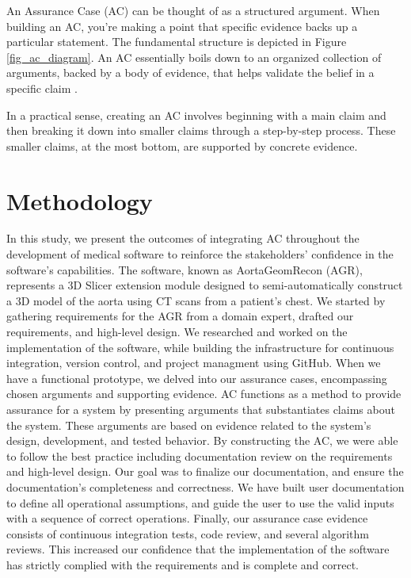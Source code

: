 An Assurance Case (AC) can be thought of as a structured argument. When building an AC, you're making a point that specific evidence backs up a particular statement. The fundamental structure is depicted in Figure \ref{fig_ac_diagram}. An AC essentially boils down to an organized collection of arguments, backed by a body of evidence, that helps validate the belief in a specific claim \cite{doi:10.2514/6.2009-1921}.

In a practical sense, creating an AC involves beginning with a main claim and then breaking it down into smaller claims through a step-by-step process. These smaller claims, at the most bottom, are supported by concrete evidence.


\section{Methodology} \label{methodology}
In this study, we present the outcomes of integrating AC throughout the development of medical software to reinforce the stakeholders' confidence in the software's capabilities. The software, known as AortaGeomRecon (AGR), represents a 3D Slicer \cite{Kikinis2014} extension module designed to semi-automatically construct a 3D model of the aorta using CT scans from a patient's chest. We started by gathering requirements for the AGR from a domain expert, drafted our requirements, and high-level design. We researched and worked on the implementation of the software, while building the infrastructure for continuous integration, version control, and project managment using GitHub. When we have a functional prototype, we delved into our assurance cases, encompassing chosen arguments and supporting evidence. AC functions as a method to provide assurance for a system by presenting arguments that substantiates claims about the system. These arguments are based on evidence related to the system's design, development, and tested behavior. By constructing the AC, we were able to follow the best practice including documentation review on the requirements and high-level design. Our goal was to finalize our documentation, and ensure the documentation's completeness and correctness. We have built user documentation to define all operational assumptions, and guide the user to use the valid inputs with a sequence of correct operations. Finally, our assurance case evidence consists of continuous integration tests, code review, and several algorithm reviews. This increased our confidence that the implementation of the software has strictly complied with the requirements and is  complete and correct.

